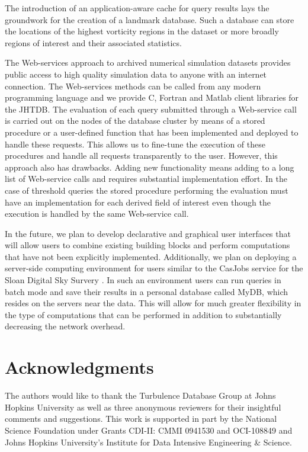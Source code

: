 \documentclass{sig-alternate}
\begin{document}
The introduction of an application-aware cache for query results lays the groundwork for the creation of a landmark database. Such a database can store the 
locations of the highest vorticity regions in the dataset or more broadly regions of interest and their associated statistics.

The Web-services approach to archived numerical simulation datasets provides public access to high quality simulation data to anyone with an internet
connection. The Web-services methods can be called from any modern programming language and we provide C, Fortran and Matlab client libraries for the
JHTDB. The evaluation of each query submitted through a Web-service call is carried out on the nodes of the database cluster by means of a stored
procedure
or a user-defined function that has been implemented and deployed to handle these requests. This allows us to fine-tune the execution of these procedures
and handle all requests transparently to the user. However, this approach also has drawbacks. Adding new functionality means adding to a long list of 
Web-service calls and requires substantial implementation effort. In the case of threshold queries the stored procedure performing the evaluation must have
an implementation for each derived field of interest even though the execution is handled by the same Web-service call. 

In the future, we plan to develop
declarative and graphical user interfaces that will allow users to combine existing building blocks and perform computations that have not been explicitly
implemented. Additionally, we plan on deploying a server-side computing environment for users similar to the CasJobs service for the Sloan Digital Sky Survery \cite{LiThakar}. In such an environment users can run queries in batch mode and save their results in a personal database called MyDB, which 
resides on the servers near the data.
This will allow for much greater flexibility in the type of computations that can be performed in addition to substantially decreasing the network overhead.

\section{Acknowledgments}
The authors would like to thank the Turbulence Database Group at Johns Hopkins University as well as three anonymous reviewers for
their insightful comments and suggestions. This work is supported in part by the National Science Foundation
under Grants CDI-II: CMMI 0941530 and OCI-108849 and Johns Hopkins University's Institute for Data Intensive Engineering \& Science.


 
\end{document}
